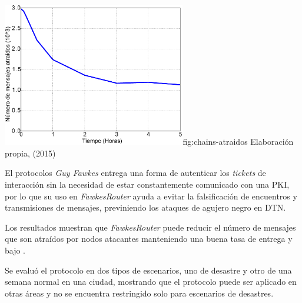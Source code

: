 

{\includegraphics[width=0.6\textwidth]{imagenes/seguridad/graficos/cadenas_atraidos.eps}}{fig:chains-atraidos}
{Elaboración propia, (2015)}





El protocolos \textit{Guy Fawkes} entrega una forma de autenticar los
\textit{tickets} de interacción sin la necesidad de estar constantemente
comunicado con una PKI, por lo que su uso en \textit{FawkesRouter} ayuda a
evitar la falsificación de encuentros y transmisiones de mensajes, previniendo
los ataques de agujero negro en DTN.

Los resultados muestran que \textit{FawkesRouter} puede reducir el número de
mensajes que son atraídos por nodos atacantes manteniendo una buena tasa de
entrega y bajo \overhead.

Se evaluó el protocolo en dos tipos de escenarios, uno de desastre y otro de una
semana normal en una ciudad, mostrando que el protocolo puede ser aplicado en
otras áreas y no se encuentra restringido solo para escenarios de desastres.
